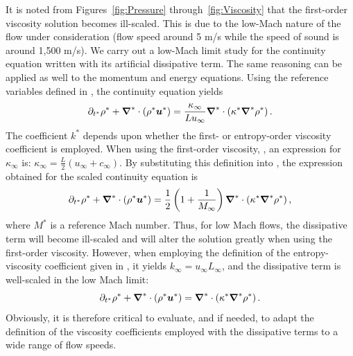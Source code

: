 It is noted from Figures~\ref{fig:Pressure} through~\ref{fig:Viscosity} that the first-order viscosity solution becomes ill-scaled. This is due to the low-Mach nature of the flow under consideration (flow speed around 5 m/s while the speed of sound is around 1,500 m/s). We carry out a low-Mach limit study for the continuity equation written with its artificial dissipative term. The same reasoning can be applied as well to the momentum and energy equations. Using the reference variables defined in , the continuity equation yields
\begin{equation}
\label{eq:cont_proof}
\partial_{t^*} \rho^* + \boldsymbol\nabla^* \cdot \left( \rho^* \boldsymbol u^* \right) =  \frac{\kappa_\infty}{L u_\infty}  \boldsymbol\nabla^* \cdot  \left( \kappa^*  \boldsymbol{\nabla}^* \rho^* \right).
\end{equation}
The coefficient $k^*$ depends upon whether the first- or entropy-order viscosity coefficient is employed. When using the first-order viscosity, , an expression for $\kappa_\infty$ is: $\kappa_\infty = \frac{L}{2}\left( u_\infty + c_\infty \right)$. By substituting this definition into , the expression obtained for the scaled continuity equation is
\begin{equation}
\label{eq:cont_proof2}
\partial_{t^*} \rho^* + \boldsymbol\nabla^* \cdot \left( \rho^* \boldsymbol u^* \right) = \frac{1}{2}\left( 1 + \frac{1}{M_\infty} \right) \boldsymbol\nabla^* \cdot \left(\kappa^*\boldsymbol{\nabla}^* \rho^* \right),
\end{equation}
where $M^*$ is a reference Mach number. Thus, for low Mach flows, the dissipative term will become ill-scaled and will alter the solution greatly
when using the first-order viscosity. However, when employing the definition of the entropy-viscosity coefficient given in , it yields $k_\infty = u_\infty L_\infty$, and the dissipative term is well-scaled in the low Mach limit:
\begin{equation}
\label{eq:cont_proof3}
\partial_{t^*} \rho^* + \boldsymbol\nabla^* \cdot \left( \rho^* \boldsymbol u^* \right) = \boldsymbol\nabla^* \cdot  \left(\kappa^* \boldsymbol{\nabla}^*  \rho^* \right).
\end{equation}
Obviously, it is therefore critical to evaluate, and if needed, to adapt the definition of the viscosity coefficients employed with the dissipative terms to a wide range of flow speeds.

